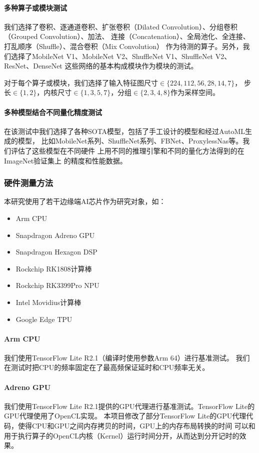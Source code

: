 \paragraph{多种算子或模块测试}
我们选择了卷积、逐通道卷积、扩张卷积（Dilated Convolution）、分组卷积（Grouped Convolution）、加法、
连接（Concatenation）、全局池化、全连接、打乱顺序（Shuffle）、混合卷积（Mix Convolution\cite{tan2019mixconv}）
作为待测的算子。另外，我们选择了MobileNet V1、MobileNet V2、ShuffleNet V1、ShuffleNet V2、ResNet、DenseNet
这些网络的基本构成模块作为模块的测试。

对于每个算子或模块，我们选择了输入特征图尺寸$\in \{224,112,56,28,14,7\}$，
步长$\in \{1,2\}$，内核尺寸$\in \{1,3,5,7\}$，分组$\in \{2,3,4,8\}$作为采样空间。

\paragraph{多种模型结合不同量化精度测试}
在该测试中我们选择了各种SOTA模型，包括了手工设计的模型和经过AutoML生成的模型，
比如MobileNet系列、ShuffleNet系列、FBNet、ProxylessNas等。我们评估了这些模型在不同硬件
上用不同的推理引擎和不同的量化方法得到的在ImageNet\cite{krizhevsky2012imagenet}验证集上
的精度和性能数据。

\subsubsection{硬件测量方法}
本研究使用了若干边缘端AI芯片作为研究对象，如：
\begin{itemize}
    \item Arm CPU
    \item Snapdragon Adreno GPU
    \item Snapdragon Hexagon DSP
    \item Rockchip RK1808计算棒
    \item Rockchip RK3399Pro NPU
    \item Intel Movidius计算棒
    \item Google Edge TPU
\end{itemize}

\paragraph{Arm CPU}
我们使用TensorFlow Lite R2.1（编译时使用参数Arm 64）进行基准测试。
我们在测试时把CPU的频率固定在了最高频保证延时和CPU频率无关。

\paragraph{Adreno GPU}
我们使用TensorFlow Lite R2.1提供的GPU代理进行基准测试。TensorFlow Lite的GPU代理使用了OpenCL实现。
本项目修改了部分TensorFlow Lite的GPU代理代码，使得CPU和GPU之间内存拷贝的时间，GPU上的内存布局转换的时间
可以和用于执行算子的OpenCL内核（Kernel）运行时间分开，从而达到分开记时的效果。

